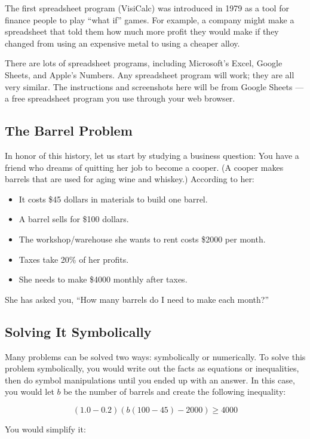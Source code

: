 The first spreadsheet program (VisiCalc) was introduced in 1979 as a
tool for finance people to play ``what if'' games.  For example, a
company might make a spreadsheet that told them how much more profit
they would make if they changed from using an expensive metal to using
a cheaper alloy.

There are lots of spreadsheet programs, including Microsoft's Excel, Google Sheets, and
Apple's Numbers. Any spreadsheet program will work; they are all very
similar. The instructions and screenshots here will be from Google
Sheets --- a free spreadsheet program you use through your web browser.

\subsection{The Barrel Problem}
In honor of this history, let us start by studying a business question:
You have a friend who dreams of quitting her job to become a cooper. (A
cooper makes barrels that are used for aging wine and whiskey.)  According to her:
\begin{itemize}
\item It costs \$45 dollars in materials to build one barrel.
\item A barrel sells for \$100 dollars.
\item The workshop/warehouse she wants to rent costs \$2000 per month.
\item Taxes take 20\% of her profits.
\item She needs to make \$4000 monthly after taxes.
\end{itemize}

She has asked you, ``How many barrels do I need to make each month?''


\subsection{Solving It Symbolically}

Many problems can be solved two ways: symbolically or
numerically. To solve this
problem symbolically, you would write out the facts as equations or
inequalities, then do symbol manipulations until you ended up with
an answer. In this case, you would let $b$ be the number of barrels
and create the following inequality:

$$(1.0 - 0.2)\left(b(100 - 45) - 2000\right) \geq 4000$$

You would simplify it:

